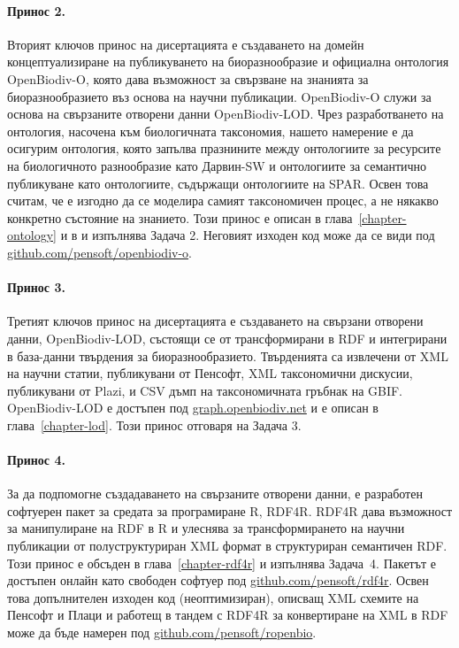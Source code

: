 \paragraph{Принос 2.} Вторият ключов принос на дисертацията е създаването на домейн концептуализиране на публикуването на биоразнообразие и официална онтология OpenBiodiv-O, която дава възможност за свързване на знанията за биоразнообразието въз основа на научни публикации. OpenBiodiv-O служи за основа на свързаните отворени данни OpenBiodiv-LOD. Чрез разработването на онтология, насочена към биологичната таксономия, нашето намерение е да осигурим онтология, която запълва празнините между онтологиите за ресурсите на биологичното разнообразие като Дарвин-SW и онтологиите за семантично публикуване като онтологиите, съдържащи онтологиите на SPAR. Освен това считам, че е изгодно да се моделира самият таксономичен процес, а не някакво конкретно състояние на знанието. Този принос е описан в глава~\ref{chapter-ontology} и в \cite{senderov_openbiodiv-o:_2018} и изпълнява Задача 2. Неговият изходен код може да се види под \href{https://github.com/pensoft/openbiodiv-o}{github.com/pensoft/openbiodiv-o}.

\paragraph{Принос 3.} Третият ключов принос на дисертацията е създаването на свързани отворени данни, OpenBiodiv-LOD, състоящи се от трансформирани в RDF и интегрирани в база-данни твърдения за биоразнообразието. Твърденията са извлечени от XML на научни статии, публикувани от Пенсофт, XML таксономични дискусии, публикувани от Plazi, и CSV дъмп на таксономичната гръбнак на GBIF. OpenBiodiv-LOD е достъпен под \href{http://graph.openbiodiv.net}{\url{graph.openbiodiv.net}} и е описан в глава~\ref{chapter-lod}. Този принос отговаря на Задача 3.

\paragraph{Принос 4.} За да подпомогне създадаването на свързаните отворени данни, е разработен софтуерен пакет за средата за програмиране R, RDF4R. RDF4R дава възможност за манипулиране на RDF в R и улеснява за трансформирането на научни публикации от полуструктуриран XML формат в структуриран семантичен RDF. Този принос е обсъден в глава~\ref{chapter-rdf4r} и изпълнява Задача~4. Пакетът е достъпен онлайн като свободен софтуер под \href{http://github.com/pensoft/rdf4r}{github.com/pensoft/rdf4r}. Освен това допълнителен изходен код (неоптимизиран), описващ XML схемите на Пенсофт и Плаци и работещ в тандем с RDF4R за конвертиране на XML в RDF може да бъде намерен под \href{http://github.com/pensoft/ropenbio}{github.com/pensoft/ropenbio}.

